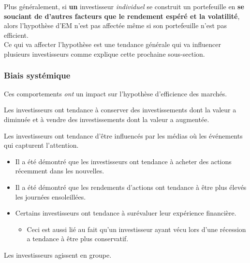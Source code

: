 \documentclass[10pt, french]{article}
\begin{document}
\begin{multicols*}{2}
Plus généralement, si \textbf{un} investisseur \textit{individuel} se construit un portefeuille en \textbf{se souciant de d'autres facteurs que le rendement espéré et la volatilité}, alors l'hypothèse d'EM n'est pas affectée même si son portefeuille n'est pas efficient. \\

Ce qui va affecter l'hypothèse est une tendance générale qui va influencer plusieurs investisseurs comme explique cette prochaine sous-section.


\subsubsection{Biais systémique}
Ces comportements \textit{\textit{ont}} un impact sur l'hypothèse d'efficience des marchés.

\begin{definitionNOHFILLsub}
Les investisseurs ont tendance à conserver des investissements dont la valeur a diminuée et à vendre des investissements dont la valeur a augmentée.
\end{definitionNOHFILLsub}

\begin{definitionNOHFILLsub}
Les investisseurs ont tendance d'être influencés par les médias où les événements qui capturent l'attention.
\begin{itemize}
	\item	Il a été démontré que les investisseurs ont tendance à acheter des actions récemment dans les nouvelles.
	\item	Il a été démontré que les rendements d'actions ont tendance à être plus élevés les journées ensoleillées.
	\item	Certains investisseurs ont tendance à surévaluer leur expérience financière.
		\begin{itemize}
		\item	Ceci est aussi lié au fait qu'un investisseur ayant vécu lors d'une récession a tendance à être plus conservatif.
		\end{itemize}
\end{itemize}
\end{definitionNOHFILLsub}

\begin{definitionNOHFILLsub}
Les investisseurs agissent en groupe.	\\


\end{definitionNOHFILLsub}
\end{multicols*}
\end{document}
